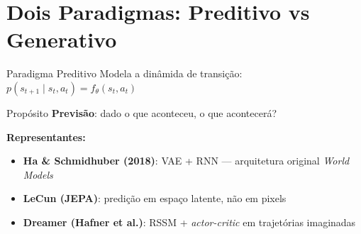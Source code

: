 \documentclass[aspectratio=169]{beamer}
\begin{document}
\section{Dois Paradigmas: Preditivo vs Generativo}

\begin{frame}{Paradigma Preditivo}
  Modela a dinâmida de transição: $p(s_{t+1} \mid s_t, a_t) = f_\theta(s_t, a_t)$

  \vspace{0.3em}
  \begin{block}{Propósito}
    \textbf{Previsão}: dado o que aconteceu, o que acontecerá?
  \end{block}

  \vspace{0.3em}
  \textbf{Representantes:}
  \begin{itemize}
    \item \textbf{Ha \& Schmidhuber (2018)}: VAE + RNN --- arquitetura original \textit{World Models}
    \item \textbf{LeCun (JEPA)}: predição em espaço latente, não em pixels
    \item \textbf{Dreamer (Hafner et al.)}: RSSM + \textit{actor-critic} em trajetórias imaginadas
  \end{itemize}

\end{frame}
\end{document}
